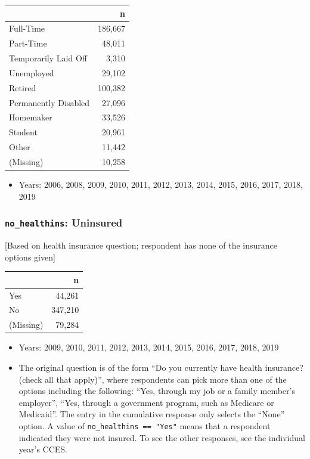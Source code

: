 \documentclass[10pt,article,oneside]{memoir}
\theoremstyle{definition}
\begin{document}
\begin{table}[H]
\centering
\begin{tabular}{lr}
\toprule
 & n\\
\midrule
Full-Time & 186,667\\
Part-Time & 48,011\\
Temporarily Laid Off & 3,310\\
Unemployed & 29,102\\
Retired & 100,382\\
Permanently Disabled & 27,096\\
Homemaker & 33,526\\
Student & 20,961\\
Other & 11,442\\
(Missing) & 10,258\\
\bottomrule
\end{tabular}
\end{table}

\begin{itemize}
\tightlist
\item
  Years: 2006, 2008, 2009, 2010, 2011, 2012, 2013, 2014, 2015, 2016,
  2017, 2018, 2019
\end{itemize}

\hypertarget{no_healthins-uninsured}{%
\subsubsection{\texorpdfstring{\texttt{no\_healthins}:
Uninsured}{no\_healthins: Uninsured}}\label{no_healthins-uninsured}}

{[}Based on health insurance question; respondent has none of the
insurance options given{]}

\begin{table}[H]
\centering
\begin{tabular}{lr}
\toprule
 & n\\
\midrule
Yes & 44,261\\
No & 347,210\\
(Missing) & 79,284\\
\bottomrule
\end{tabular}
\end{table}

\begin{itemize}
\tightlist
\item
  Years: 2009, 2010, 2011, 2012, 2013, 2014, 2015, 2016, 2017, 2018,
  2019
\item
  The original question is of the form ``Do you currently have health
  insurance? (check all that apply)'', where respondents can pick more
  than one of the options including the following: ``Yes, through my job
  or a family member's employer'', ``Yes, through a government program,
  such as Medicare or Medicaid''. The entry in the cumulative response
  only selects the ``None'' option. A value of
  \texttt{no\_healthins\ ==\ "Yes"} means that a respondent indicated
  they were not insured. To see the other responses, see the individual
  year's CCES.
\end{itemize}
\end{document}
